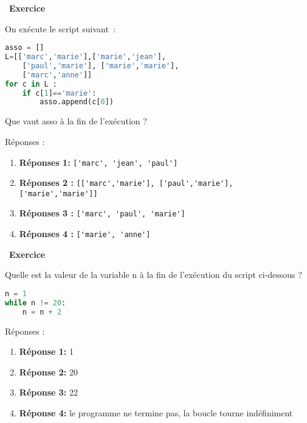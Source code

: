 \documentclass[
  11pt,
]{article}
\newcommand{\passthrough}[1]{#1}
\newcounter{exo}
\newenvironment{exercice}[1]
{\par \medskip   \addtocounter{exo}{1} \noindent  
\begin{bclogo}[arrondi =0.1,   noborder = true, logo=\bccrayon, marge=4]{~\textbf{Exercice} \textbf{\theexo} {\itshape #1} }  \par}
{
\end{bclogo}
 \par \bigskip }
\newcounter{def}
\newcounter{prog}
\begin{document}
\begin{exercice}{}

On exécute le script suivant~:

\begin{lstlisting}[language=Python]
asso = []
L=[['marc','marie'],['marie','jean'],
    ['paul','marie'], ['marie','marie'],
    ['marc','anne']]
for c in L :
    if c[1]=='marie':
        asso.append(c[0])
\end{lstlisting}

Que vaut asso à la fin de l'exécution ?

Réponses :

\begin{enumerate}
\def\labelenumi{\arabic{enumi}.}
\item
  \textbf{Réponses 1:}
  \passthrough{\lstinline!['marc', 'jean', 'paul']!}
\item
  \textbf{Réponses 2 :}
  \passthrough{\lstinline![['marc','marie'], ['paul','marie'], ['marie','marie']]!}
\item
  \textbf{Réponses 3 :}
  \passthrough{\lstinline!['marc', 'paul', 'marie']!}
\item
  \textbf{Réponses 4 :} \passthrough{\lstinline!['marie', 'anne']!}
\end{enumerate}

\end{exercice}

\begin{exercice}{}

Quelle est la valeur de la variable n à la fin de l'exécution du script
ci-dessous ?

\begin{lstlisting}[language=Python]
n = 1
while n != 20:
    n = n + 2
\end{lstlisting}

Réponses :

\begin{enumerate}
\def\labelenumi{\arabic{enumi}.}
\item
  \textbf{Réponse 1:} 1
\item
  \textbf{Réponse 2:} 20
\item
  \textbf{Réponse 3:} 22
\item
  \textbf{Réponse 4:} le programme ne termine pas, la boucle tourne
  indéfiniment
\end{enumerate}

\end{exercice}
\end{document}

